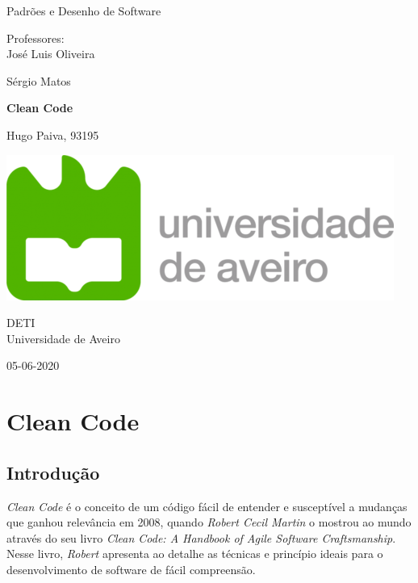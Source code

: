 \documentclass[10pt,portuguese]{article}
\begin{document}
\begin{titlepage}
	\clearpage\thispagestyle{empty}
	\centering
	\vspace{2cm}

	
	{\Large  Padrões e Desenho de Software \par}
	\vspace{0.5cm}
	{\small Professores: \\
	José Luis Oliveira\par
	Sérgio Matos\par}
	\vspace{4cm}
	{\Huge \textbf{Clean Code}} \\
	\vspace{1cm}
	\vspace{4cm}
	{\normalsize  Hugo Paiva, 93195
	   \par}
	 
	\vspace{2cm}

    \includegraphics[scale=0.20]{logo_ua.png}
    
    \vspace{2cm}
    
	{\normalsize DETI \\ 
		Universidade de Aveiro \par}
		
	{\normalsize 05-06-2020 \par}
	\vspace{2cm}
		
	
	\pagebreak

\end{titlepage}
\tableofcontents{}
\clearpage

\section{Clean Code}
\subsection{Introdução}

\par \textit{Clean Code} é o conceito de um código fácil de entender e susceptível a mudanças que ganhou relevância em 2008, quando \textit{Robert Cecil Martin} o mostrou ao mundo através do seu livro \textit{Clean Code: A Handbook of Agile Software Craftsmanship}. Nesse livro, \textit{Robert} apresenta ao detalhe as técnicas e princípio ideais para o desenvolvimento de software de fácil compreensão.
\end{document}
